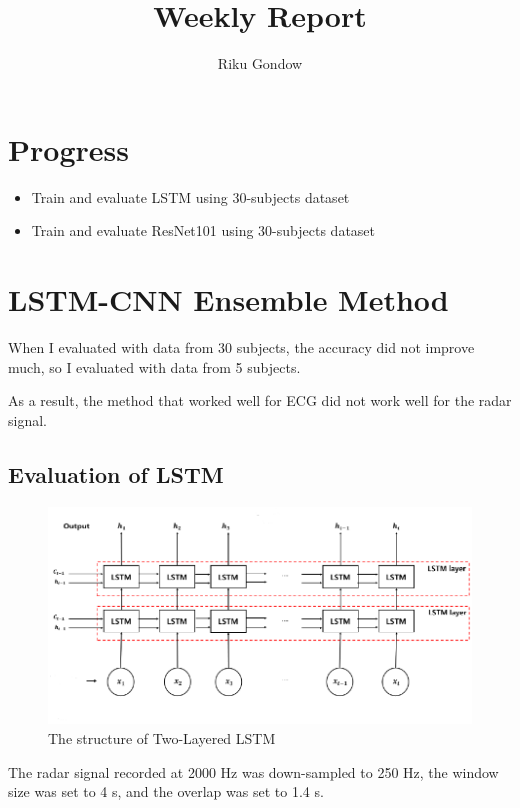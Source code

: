 \documentclass[dvipdfmx]{article}
\begin{document}
\title{Weekly Report}
\author{Riku Gondow}
\maketitle
\section{Progress}
\begin{itemize}
    \item Train and evaluate LSTM using 30-subjects dataset
    \item Train and evaluate ResNet101 using 30-subjects dataset
\end{itemize}

\section{LSTM-CNN Ensemble Method\cite{lstm}}
When I evaluated with data from 30 subjects, the accuracy did not improve much, so I evaluated with data from 5 subjects.

As a result, the method that worked well for ECG did not work well for the radar signal.

\subsection{Evaluation of LSTM}

\begin{figure}[H]
\begin{center}
\includegraphics[width=\linewidth]{./img/LSTM.png}
\end{center}
\caption{The structure of Two-Layered LSTM}
\end{figure}

The radar signal recorded at 2000 Hz was down-sampled to 250 Hz, the window size was set to 4 s, and the overlap was set to 1.4 s.
\end{document}
